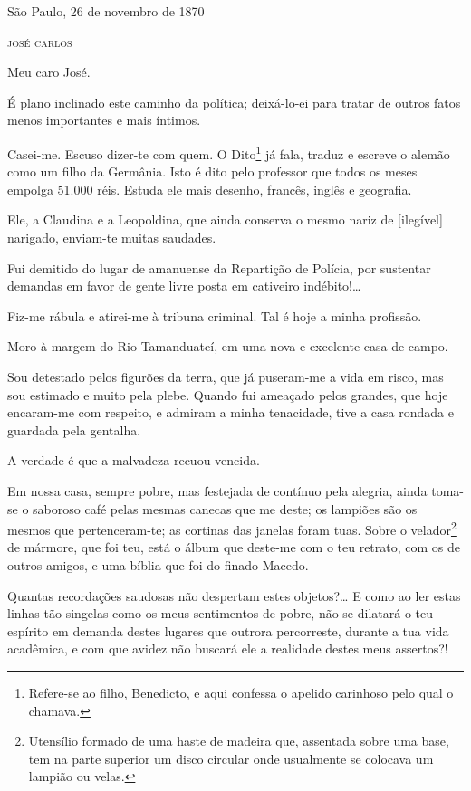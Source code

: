 {\begin{flushright}
São Paulo, 26 de novembro de 1870

\textsc{josé carlos}
\end{flushright}

\asterisc{}

Meu caro José.

É plano inclinado este caminho da política; deixá-lo-ei para tratar de
outros fatos menos importantes e mais íntimos.

Casei-me. Escuso dizer-te com quem. O {Dito}\footnote{ Refere-se ao
  filho, Benedicto, e aqui confessa o apelido carinhoso pelo qual o
  chamava.} já fala, traduz e escreve o alemão como um filho da
Germânia. Isto é dito pelo professor que todos os meses empolga 51.000
réis. Estuda ele mais desenho, francês, inglês e geografia.

Ele, a Claudina e a Leopoldina, que ainda conserva o mesmo nariz de
{[}ilegível{]} narigado, enviam-te muitas saudades.

Fui demitido do lugar de amanuense da Repartição de Polícia, por
sustentar demandas em favor de gente livre posta em cativeiro
indébito!\ldots{}

Fiz-me rábula e atirei-me à tribuna criminal. Tal é hoje a minha
profissão.

Moro à margem do Rio Tamanduateí, em uma nova e excelente casa de campo.

Sou detestado pelos figurões da terra, que já puseram-me a vida em
risco, mas sou estimado e muito pela plebe. Quando fui ameaçado pelos
grandes, que hoje encaram-me com respeito, e admiram a minha tenacidade,
tive a casa rondada e guardada pela gentalha.

A verdade é que a malvadeza recuou vencida.

Em nossa casa, sempre pobre, mas festejada de contínuo pela alegria,
ainda toma-se o saboroso café pelas mesmas canecas que me deste; os
lampiões são os mesmos que pertenceram-te; as cortinas das janelas foram
tuas. Sobre o velador\footnote{ Utensílio formado de uma haste de
  madeira que, assentada sobre uma base, tem na parte superior um disco
  circular onde usualmente se colocava um lampião ou velas.} de mármore,
que foi teu, está o álbum que deste-me com o teu retrato, com os de
outros amigos, e uma bíblia que foi do finado Macedo.

Quantas recordações saudosas não despertam estes objetos?\ldots{} E como ao
ler estas linhas tão singelas como os meus sentimentos de pobre, não se
dilatará o teu espírito em demanda destes lugares que outrora
percorreste, durante a tua vida acadêmica, e com que avidez não buscará
ele a realidade destes meus assertos?!

}
